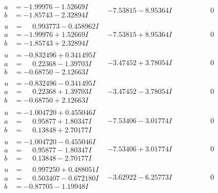 \documentclass[1p]{elsarticle_modified}
\theoremstyle{definition}
\begin{document}
$$\begin{array}{c|c|c}
\begin{aligned}
a &= -1.99976 - 1.52669 I \\
b &= -1.85743 - 2.32894 I\end{aligned}
 & -7.53815 - 8.95364 I & \phantom{-0.000000 } 0 \\ \hline\begin{aligned}
u &= \phantom{-}0.993773 - 0.458962 I \\
a &= -1.99976 + 1.52669 I \\
b &= -1.85743 + 2.32894 I\end{aligned}
 & -7.53815 + 8.95364 I & \phantom{-0.000000 } 0 \\ \hline\begin{aligned}
u &= -0.832496 + 0.341495 I \\
a &= \phantom{-}0.22368 - 1.39703 I \\
b &= -0.68750 - 2.12663 I\end{aligned}
 & -3.47452 + 3.78054 I & \phantom{-0.000000 } 0 \\ \hline\begin{aligned}
u &= -0.832496 - 0.341495 I \\
a &= \phantom{-}0.22368 + 1.39703 I \\
b &= -0.68750 + 2.12663 I\end{aligned}
 & -3.47452 - 3.78054 I & \phantom{-0.000000 } 0 \\ \hline\begin{aligned}
u &= -1.004720 + 0.455046 I \\
a &= \phantom{-}0.95877 + 1.80347 I \\
b &= \phantom{-}0.13848 + 2.70177 I\end{aligned}
 & -7.53406 - 3.01774 I & \phantom{-0.000000 } 0 \\ \hline\begin{aligned}
u &= -1.004720 - 0.455046 I \\
a &= \phantom{-}0.95877 - 1.80347 I \\
b &= \phantom{-}0.13848 - 2.70177 I\end{aligned}
 & -7.53406 + 3.01774 I & \phantom{-0.000000 } 0 \\ \hline\begin{aligned}
u &= \phantom{-}0.997250 + 0.488051 I \\
a &= \phantom{-}0.503407 - 0.672180 I \\
b &= -0.87705 - 1.19948 I\end{aligned}
 & -3.62922 - 6.25773 I & \phantom{-0.000000 } 0 \\ \hline\begin{aligned}

\end{aligned}
\end{array}$$
\end{document}
